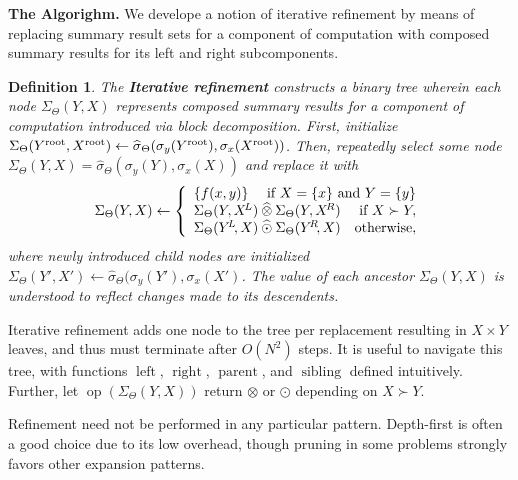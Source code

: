 \documentclass{article}
\newtheorem{definition} {Definition}
\newcommand{\killspace}{\vspace{-0.08in}}
\newcommand{\GNP}[1][\psi]{{#1}_{\Theta}}
\newcommand{\sigmahat}{\mathbin{\widehat{\sigma}}}
\newcommand{\otimeshat}{\mathbin{\widehat{\otimes}}}
\newcommand{\odothat}{\mathbin{\widehat{\odot}}}
\DeclareMathOperator{\leftchild}{left}
\DeclareMathOperator{\rightchild}{right}
\DeclareMathOperator{\parent}{parent}
\DeclareMathOperator{\sibling}{sibling}
\DeclareMathOperator{\op}{op}
\newcommand{\kdroot}[1]{#1^{\text{\rm root}}}
\newcommand{\kdleft}[1]{#1^{\!L}}
\newcommand{\kdright}[1]{#1^{\!R}}
\begin{document}
{\bf The Algorighm.}  We develope a notion of iterative refinement by
means of replacing summary result sets for a component of computation
with composed summary results for its left and right subcomponents.
\begin{definition}
  The {\bf }
  {\bf Iterative refinement} constructs a binary tree wherein each
  node $\GNP[\Sigma](Y,X)$ represents composed summary results for a
  component of computation introduced via block decomposition.  First,
  initialize $\GNP[\Sigma](\kdroot{Y},\kdroot{X}) \gets
  \GNP[\sigmahat](\sigma_y(\kdroot{Y}),\sigma_x(\kdroot{X}))$.  Then,
  repeatedly select some node $\GNP[\Sigma](Y,X) =
  \GNP[\sigmahat](\sigma_y(Y),\sigma_x(X))$ and replace it with
  \[
  \GNP[\Sigma](Y,X) \gets \left\{ \begin{array}{lrr}
    \{f(x,y)\} & \multicolumn{2}{r}{\mbox{\rm if } X = \{x\} \mbox{ \rm and } Y = \{y\}} \\
    \multicolumn{2}{l}{\GNP[\Sigma](Y,\kdleft{X}) \otimeshat \GNP[\Sigma](Y,\kdright{X})} & \mbox{\rm if } X \succ Y, \\
    \multicolumn{2}{l}{\GNP[\Sigma](\kdleft{Y}\!,X) \odothat \GNP[\Sigma](\kdright{Y}\!,X)} & \mbox{\rm otherwise},
  \end{array} \right.
  \]
  where newly introduced child nodes are initialized
  $\GNP[\Sigma](Y',X') \gets \GNP[\sigmahat](\sigma_y(Y'),\sigma_x(X')$.
  The value of each ancestor $\GNP[\Sigma](Y,X)$ is understood to
  reflect changes made to its descendents.
\end{definition}
\killspace
\noindent Iterative refinement adds one node to the tree per replacement resulting in $X \times Y$ leaves, and thus must terminate after $O(N^2)$ steps.
It is useful to navigate this tree, with functions $\leftchild$, $\rightchild$, $\parent$, and $\sibling$ defined intuitively.
Further, let $\op(\GNP[\Sigma](Y,X))$ return $\otimes$ or $\odot$ depending on $X \succ Y$.

Refinement need not be performed in any particular pattern.
Depth-first is often a good choice due to its low overhead, though
pruning in some problems strongly favors other expansion patterns.

\end{document}
